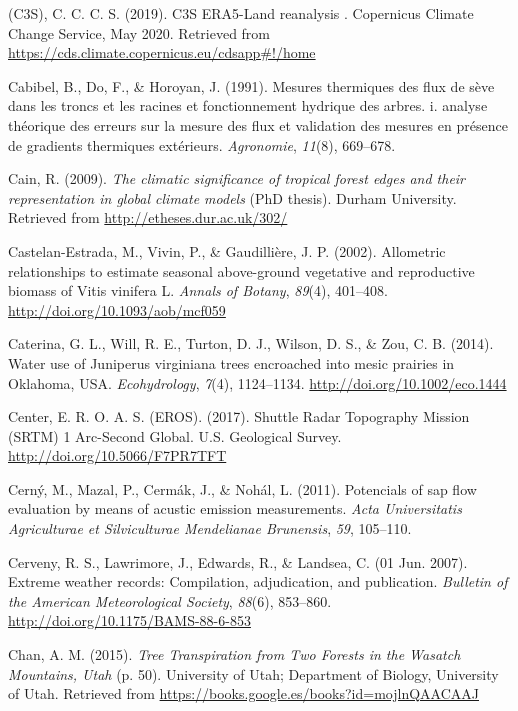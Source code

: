 \documentclass[11pt,twoside]{reedthesis}
\begin{document}
\hypertarget{ref-copernicus_climate_change_service_c3s_c3s_2019}{}
(C3S), C. C. C. S. (2019). C3S ERA5-Land reanalysis . Copernicus Climate
Change Service, May 2020. Retrieved from
\url{https://cds.climate.copernicus.eu/cdsapp\#!/home}

\hypertarget{ref-Cabibel1991}{}
Cabibel, B., Do, F., \& Horoyan, J. (1991). Mesures thermiques des flux
de sève dans les troncs et les racines et fonctionnement hydrique des
arbres. i. analyse théorique des erreurs sur la mesure des flux et
validation des mesures en présence de gradients thermiques extérieurs.
\emph{Agronomie}, \emph{11}(8), 669--678.

\hypertarget{ref-Cain2009}{}
Cain, R. (2009). \emph{The climatic significance of tropical forest
edges and their representation in global climate models} (PhD thesis).
Durham University. Retrieved from \url{http://etheses.dur.ac.uk/302/}

\hypertarget{ref-Castelan-Estrada2002}{}
Castelan-Estrada, M., Vivin, P., \& Gaudillière, J. P. (2002).
Allometric relationships to estimate seasonal above-ground vegetative
and reproductive biomass of Vitis vinifera L. \emph{Annals of Botany},
\emph{89}(4), 401--408. \url{http://doi.org/10.1093/aob/mcf059}

\hypertarget{ref-Caterina2014}{}
Caterina, G. L., Will, R. E., Turton, D. J., Wilson, D. S., \& Zou, C.
B. (2014). Water use of Juniperus virginiana trees encroached into mesic
prairies in Oklahoma, USA. \emph{Ecohydrology}, \emph{7}(4), 1124--1134.
\url{http://doi.org/10.1002/eco.1444}

\hypertarget{ref-earth_resources_observation_and_science_eros_center_shuttle_2017}{}
Center, E. R. O. A. S. (EROS). (2017). Shuttle Radar Topography Mission
(SRTM) 1 Arc-Second Global. U.S. Geological Survey.
\url{http://doi.org/10.5066/F7PR7TFT}

\hypertarget{ref-Cern2011}{}
Cerný, M., Mazal, P., Cermák, J., \& Nohál, L. (2011). Potencials of sap
flow evaluation by means of acustic emission measurements. \emph{Acta
Universitatis Agriculturae et Silviculturae Mendelianae Brunensis},
\emph{59}, 105--110.

\hypertarget{ref-Cerveny2007}{}
Cerveny, R. S., Lawrimore, J., Edwards, R., \& Landsea, C. (01 Jun.
2007). Extreme weather records: Compilation, adjudication, and
publication. \emph{Bulletin of the American Meteorological Society},
\emph{88}(6), 853--860. \url{http://doi.org/10.1175/BAMS-88-6-853}

\hypertarget{ref-Chan2015}{}
Chan, A. M. (2015). \emph{Tree Transpiration from Two Forests in the
Wasatch Mountains, Utah} (p. 50). University of Utah; Department of
Biology, University of Utah. Retrieved from
\url{https://books.google.es/books?id=mojlnQAACAAJ}
\end{document}
